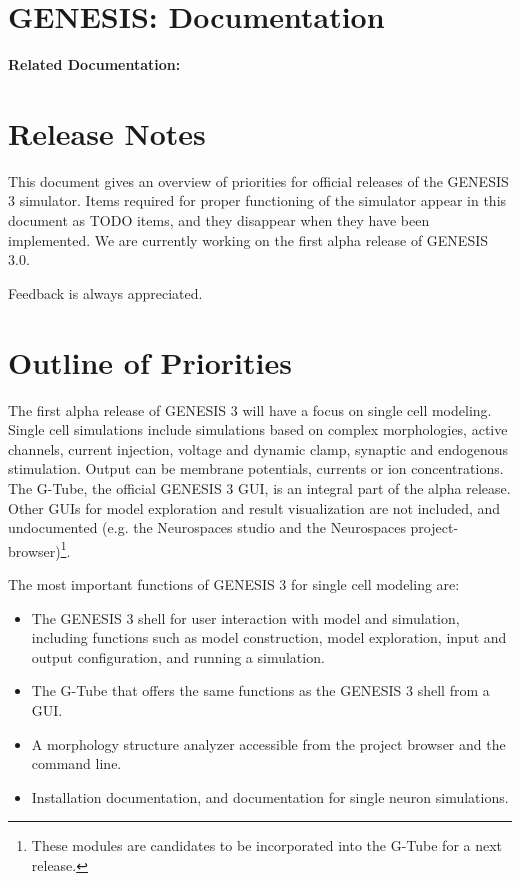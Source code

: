 \documentclass[12pt]{article}
\begin{document}
\section*{GENESIS: Documentation}

{\bf Related Documentation:}

\section*{Release Notes}

This document gives an overview of priorities for official releases of
the GENESIS 3 simulator.  Items required for proper functioning of the
simulator appear in this document as TODO items, and they disappear
when they have been implemented.  We are currently working on the
first alpha release of GENESIS 3.0.

Feedback is always appreciated.


\section{Outline of Priorities}

The first alpha release of GENESIS 3 will have a focus on single cell
modeling.  Single cell simulations include simulations based on
complex morphologies, active channels, current injection, voltage and
dynamic clamp, synaptic and endogenous stimulation.  Output can be
membrane potentials, currents or ion concentrations.  The G-Tube, the
official GENESIS 3 GUI, is an integral part of the alpha release.
Other GUIs for model exploration and result visualization are not
included, and undocumented (e.g. the Neurospaces studio and the
Neurospaces project-browser)\footnote{These modules are candidates to
  be incorporated into the G-Tube for a next release.}.

The most important functions of GENESIS 3 for single cell modeling
are:

\begin{itemize}
\item The GENESIS 3 shell for user interaction with model and
  simulation, including functions such as model construction, model
  exploration, input and output configuration, and running a
  simulation.
\item The G-Tube that offers the same functions as the GENESIS 3 shell
  from a GUI.
\item A morphology structure analyzer accessible from the project
  browser and the command line.
\item Installation documentation, and documentation for single neuron
  simulations.
\end{itemize}
\end{document}
